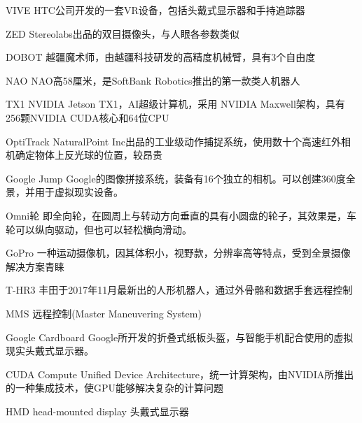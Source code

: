 \begin{denotation}[3cm]
\item[VIVE] HTC公司开发的一套VR设备，包括头戴式显示器和手持追踪器
\item[ZED] Stereolabs出品的双目摄像头，与人眼各参数类似
\item[DOBOT] 越疆魔术师，由越疆科技研发的高精度机械臂，具有3个自由度
\item[NAO] NAO高58厘米，是SoftBank Robotics推出的第一款类人机器人
\item[TX1]  NVIDIA Jetson TX1，AI超级计算机，采用 NVIDIA Maxwell架构，具有256颗NVIDIA CUDA核心和64位CPU
\item[OptiTrack]  NaturalPoint Inc出品的工业级动作捕捉系统，使用数十个高速红外相机确定物体上反光球的位置，较昂贵
\item[Google Jump] Google的图像拼接系统，装备有16个独立的相机。可以创建360度全景，并用于虚拟现实设备。
\item[Omni轮] 即全向轮，在圆周上与转动方向垂直的具有小圆盘的轮子，其效果是，车轮可以纵向驱动，但也可以轻松横向滑动。
\item[GoPro] 一种运动摄像机，因其体积小，视野款，分辨率高等特点，受到全景摄像解决方案青睐
\item[T-HR3]丰田于2017年11月最新出的人形机器人，通过外骨骼和数据手套远程控制
\item[MMS]远程控制(Master Maneuvering System)
\item[Google Cardboard] Google所开发的折叠式纸板头盔，与智能手机配合使用的虚拟现实头戴式显示器。
\item[CUDA] Compute Unified Device Architecture，统一计算架构，由NVIDIA所推出的一种集成技术，使GPU能够解决复杂的计算问题
\item[HMD] head-mounted display 头戴式显示器
\item[]
\item[]



\end{denotation}
